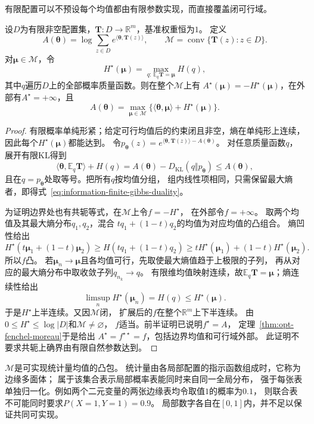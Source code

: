有限配置可以不预设每个均值都由有限参数实现，而直接覆盖闭可行域。
\begin{theorem}[有限配置上的配分函数与最大熵对偶]
\label{thm:information-finite-entropy-duality}
设\(D\)为有限非空配置集，\(\bm T:D\to\mathbb R^m\)，基准权重恒为\(1\)。
定义
\[
  A(\bm\theta)=\log\sum_{z\in D}e^{\langle\bm\theta,\bm T(z)\rangle},
  \qquad\mathcal M=\operatorname{conv}\{\bm T(z):z\in D\}.
\]
对\(\bm\mu\in\mathcal M\)，令
\[
  H^\star(\bm\mu)=\max_{q:\,\mathbb E_q\bm T=\bm\mu}H(q),
\]
其中\(q\)遍历\(D\)上的全部概率质量函数。则在整个\(\mathcal M\)上有
\(A^\star(\bm\mu)=-H^\star(\bm\mu)\)，在外部有\(A^\star=+\infty\)，且
\begin{equation}
  A(\bm\theta)=\max_{\bm\mu\in\mathcal M}
  \{\langle\bm\theta,\bm\mu\rangle+H^\star(\bm\mu)\}.
  \label{eq:information-finite-gibbs-duality}
\end{equation}
\end{theorem}
\begin{proof}
有限概率单纯形紧；给定可行均值后的约束闭且非空，熵在单纯形上连续，
因此每个\(H^\star(\bm\mu)\)都能达到。
令\(p_{\bm\theta}(z)=e^{\langle\bm\theta,\bm T(z)\rangle-A(\bm\theta)}\)。
对任意质量函数\(q\)，展开有限KL得到
\[
  \langle\bm\theta,\mathbb E_q\bm T\rangle+H(q)
  =A(\bm\theta)-D_{\mathrm{KL}}(q\Vert p_{\bm\theta})
  \leq A(\bm\theta),
\]
且在\(q=p_{\bm\theta}\)处取等号。把所有\(q\)按均值分组，
组内线性项相同，只需保留最大熵者，即得式~\eqref{eq:information-finite-gibbs-duality}。

为证明边界处也有共轭等式，在\(\mathcal M\)上令\(f=-H^\star\)，
在外部令\(f=+\infty\)。
取两个均值及其最大熵分布\(q_1,q_2\)，混合
\(tq_1+(1-t)q_2\)的均值为对应均值的凸组合。
熵凹性给出
\[
  H^\star(t\bm\mu_1+(1-t)\bm\mu_2)
  \geq H(tq_1+(1-t)q_2)
  \geq tH^\star(\bm\mu_1)+(1-t)H^\star(\bm\mu_2).
\]
所以\(f\)凸。
若\(\bm\mu_n\to\bm\mu\)且各均值可行，先取使最大熵值趋于上极限的子列，
再从对应的最大熵分布中取收敛子列\(q_{n_k}\to q\)。
有限维均值映射连续，故\(\mathbb E_q\bm T=\bm\mu\)；熵连续性给出
\[
  \limsup_nH^\star(\bm\mu_n)=H(q)\leq H^\star(\bm\mu).
\]
于是\(H^\star\)上半连续。又因\(\mathcal M\)闭，
扩展后的\(f\)在整个\(\mathbb R^m\)上下半连续。
由\(0\leq H^\star\leq\log|D|\)和\(\mathcal M\neq\varnothing\)，
\(f\)适当。前半证明已说明\(f^\star=A\)，
定理~\ref{thm:opt-fenchel-moreau}于是给出
\(A^\star=f^{\star\star}=f\)，包括边界均值和可行域外部。
此证明不要求共轭上确界由有限自然参数达到。
\end{proof}

\(\mathcal M\)是可实现统计量均值的凸包。
统计量由各局部配置的指示函数组成时，它称为边缘多面体；
属于该集合表示局部概率表能同时来自同一全局分布，
强于每张表单独归一化。例如两个二元变量的两张边缘表均令取值\(1\)的概率为\(0.1\)，
则联合表不可能同时要求\(P(X=1,Y=1)=0.9\)。
局部数字各自在\([0,1]\)内，并不足以保证共同可实现。


